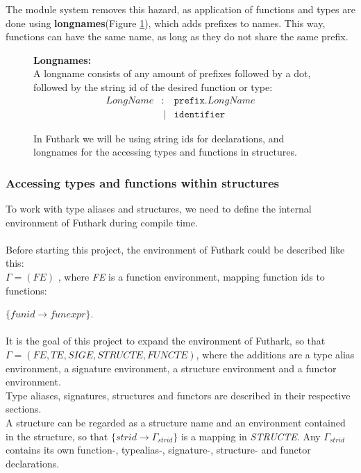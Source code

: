 The module system removes this hazard, as application of functions and types are
done using \textbf{longnames}(Figure \ref{LongnameDef}), which adds prefixes to names. This way, functions
can have the same name, as long as they do not share the same prefix.
\begin{figure}
\begin{tcolorbox}
\textbf{Longnames:}\\
A longname consists of any amount of prefixes followed by a dot, followed by the
string id of the desired function or type:
\begin{align*}
LongName & :  & \texttt{prefix.}LongName \\
         &\ | & \texttt{identifier}
\end{align*}

\caption{In Futhark we will be using string ids for declarations, and longnames for
the accessing types and functions in structures. \label{LongnameDef}}
\end{tcolorbox}
\end{figure}
\clearpage
\subsubsection{Accessing types and functions within structures}
To work with type aliases and structures, we need to define the internal
environment of Futhark during compile time.\\
\\
Before starting this project, the environment of Futhark could be described like
this:\\
$\Gamma = (FE)$ , where \textit{FE} is a function environment, mapping function ids to functions:

 $\{funid \to funexpr\}$.
\\\\
It is the goal of this project to expand the environment of Futhark, so that\\[0.2em]
$\Gamma = (FE, TE, SIGE, STRUCTE, FUNCTE)$, where the additions are a type alias environment, a signature environment, a structure environment and a functor environment.\\[0.2em]
Type aliases, signatures, structures and functors are described in their respective
sections.\\
A structure can be regarded as a structure name and an environment contained in the structure, so that
$\{strid \to \Gamma_{strid}\}$ is a mapping in \textit{STRUCTE}.
Any $\Gamma_{strid}$ contains its own function-, typealias-, signature-, structure- and functor declarations.\\
\\
\clearpage

